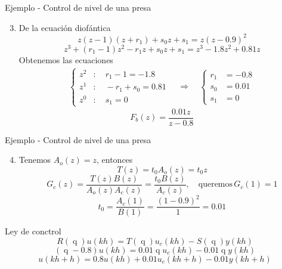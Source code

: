 \documentclass[presentation,aspectratio=169]{beamer}
\DeclareMathOperator{\shift}{q}
\begin{document}
\begin{frame}[label={sec:orgec59c59}]{Ejemplo - Control de nivel de una presa}
\begin{enumerate}
\setcounter{enumi}{2}
\item De la ecuación diofántica \[ z(z-1)(z+r_1) + s_0z + s_1 = z(z-0.9)^2\]
\[ z^3 + (r_1-1)z^2 - r_1z + s_0z + s_1 = z^3 -1.8z^2 + 0.81z\]
Obtenemos las ecuaciones 
\begin{align*}
\begin{cases} z^2 &: \quad r_1-1 = -1.8\\
z^1 &: \quad -r_1 + s_0 = 0.81\\
z^0 &: \quad s_1 = 0
\end{cases}
\quad \Rightarrow \quad 
\begin{cases} r_1 &= -0.8\\ s_0 &= 0.01\\ s_1 &=0 \end{cases}
\end{align*}
\[F_b(z) = \frac{0.01z}{z - 0.8}\]
\end{enumerate}
\end{frame}

\begin{frame}[label={sec:org072c55a}]{Ejemplo - Control de nivel de una presa}
\begin{enumerate}
\setcounter{enumi}{3}
\item Tenemos \(A_o(z) = z\), entonces 
\[T(z) = t_0A_o(z) = t_0z\]
\[G_c(z) = \frac{T(z)B(z)}{A_o(z)A_c(z)} = \frac{t_0 B(z)}{A_c(z)}, \quad \text{queremos}\, G_c(1)=1\]
\[ t_0 = \frac{A_c(1)}{B(1)} = \frac{(1-0.9)^2}{1} = 0.01\]
\end{enumerate}

\alert{Ley de conctrol}
\[R(\shift) u(kh) = T(\shift)u_c(kh) - S(\shift)y(kh)\]
\[ (\shift - 0.8)u(kh) = 0.01\shift u_c(kh) - 0.01\shift y(kh)\]
\[ u(kh+h) = 0.8u(kh) + 0.01 u_c(kh+h) - 0.01y(kh+h)\]
\end{frame}
\end{document}
